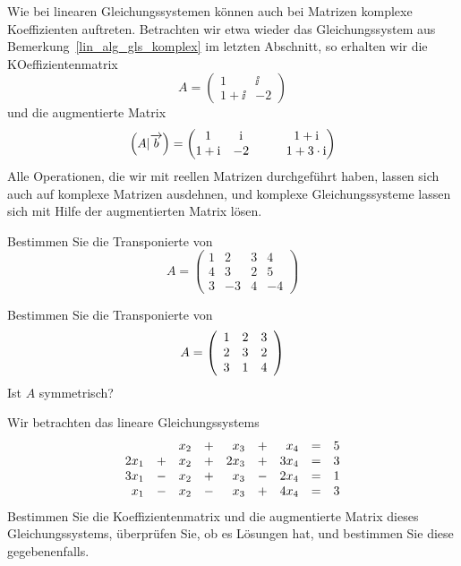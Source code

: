 \begin{notiz}\label{lin_alg_matrix_gls_komplex} Wie bei linearen Gleichungssystemen können auch bei Matrizen 
komplexe Koeffizienten auftreten. Betrachten wir etwa wieder das Gleichungssystem aus 
Bemerkung~\ref{lin_alg_gls_komplex} im letzten Abschnitt, so erhalten wir die KOeffizientenmatrix
  	$$ A = \left( \begin{matrix} 1 & \ii \\ 1+\ii & -2 \end{matrix} \right) $$
und die augmentierte Matrix
  	$$ \left( A \vert \vektor{b} \right) = \left( \begin{matrix} 1 & \ii & \quad & 1 + \ii 
   	\\ 1+\ii & -2 & & 1 + 3 \cdot \ii \end{matrix} \right) $$
Alle Operationen, die wir mit reellen Matrizen durchgeführt haben, lassen sich auch auf komplexe Matrizen 
ausdehnen, und komplexe Gleichungssysteme lassen sich mit Hilfe der augmentierten Matrix lösen.
\end{notiz}

\bigbreak

\begin{aufgabe} Bestimmen Sie die Transponierte von 
	$$ A = \left( \begin{matrix}
	1 & 2 & 3 & 4 \\ 4 & 3 & 2 & 5 \\ 3 & - 3 & 4 & - 4 \end{matrix} \right) $$
\end{aufgabe}

\begin{aufgabe} Bestimmen Sie die Transponierte von 
  	$$ A = \left( \begin{array}{ l  l  l }
	1 & 2 & 3   \\ 2 & 3 & 2  \\ 3 & 1 & 4  \end{array} \right) $$ 
Ist $A$ symmetrisch? 
\end{aufgabe}

\begin{aufgabe} Wir betrachten das lineare Gleichungssystems
  	$$ \begin{array} {r c r c r c r c l}
    	&  &  x_2 & + &  x_3 & + & x_4 & = & 5 \\
   	2 x_1 &  +  &  x_2  & + & 2 x_3 & + & 3 x_4 & = & 3 \\
   	3 x_1 & - &  x_2 & +  & x_3   & - & 2 x_4 & = & 1 \\
  	x_1 & - & x_2 & - & x_3 & + & 4 x_4 & = & 3
   	\end{array} $$
Bestimmen Sie die Koeffizientenmatrix und die augmentierte Matrix dieses Gleichungssystems, 
überprüfen Sie, ob es Lösungen hat, und bestimmen Sie diese gegebenenfalls.
\end{aufgabe}

